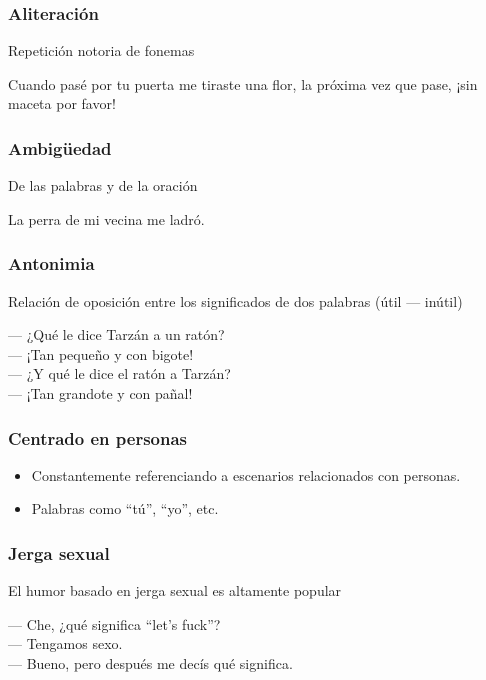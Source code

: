 \begin{frame}
    \frametitle{Aliteración}

    Repetición notoria de fonemas

    \begin{example}
        Cuando pasé por tu puerta me tiraste una flor, la próxima vez que pase, ¡sin maceta por favor!
    \end{example}
\end{frame}

\begin{frame}
    \frametitle{Ambigüedad}
    
    De las palabras y de la oración

    \begin{example}
        La perra de mi vecina me ladró.
    \end{example}
\end{frame}

\begin{frame}
    \frametitle{Antonimia}
    
    Relación de oposición entre los significados de dos palabras (útil --- inútil)

    \begin{example}
        --- ¿Qué le dice Tarzán a un ratón? \\
        --- ¡Tan pequeño y con bigote! \\
        --- ¿Y qué le dice el ratón a Tarzán? \\
        --- ¡Tan grandote y con pañal! \\
    \end{example}
\end{frame}

\begin{frame}
    \frametitle{Centrado en personas}
    
    \begin{itemize}
        \item Constantemente referenciando a escenarios relacionados con personas.
        
        \item Palabras como “tú”, “yo”, etc.
    \end{itemize}
\end{frame}

\begin{frame}
    \frametitle{Jerga sexual}
    
    El humor basado en jerga sexual es altamente popular

    \begin{example}
        --- Che, ¿qué significa “let’s fuck”? \\
        --- Tengamos sexo. \\
        --- Bueno, pero después me decís qué significa.
    \end{example}
\end{frame}


